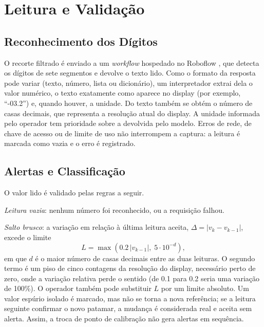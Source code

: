 \documentclass[10pt,twocolumn,letterpaper]{article}
\begin{document}
\section{Leitura e Validação}

\subsection{Reconhecimento dos Dígitos}

O recorte filtrado é enviado a um \textit{workflow} hospedado no Roboflow
\cite{roboflow}, que detecta os dígitos de sete segmentos e devolve o texto
lido. Como o formato da resposta pode variar (texto, número, lista ou
dicionário), um interpretador extrai dela o valor numérico, o texto exatamente
como aparece no display (por exemplo, ``-03.2'') e, quando houver, a unidade.
Do texto também se obtém o número de casas decimais, que representa a
resolução atual do display. A unidade informada pelo operador tem prioridade
sobre a devolvida pelo modelo. Erros de rede, de chave de acesso ou de limite
de uso não interrompem a captura: a leitura é marcada como vazia e o erro é
registrado.

\subsection{Alertas e Classificação}

O valor lido é validado pelas regras a seguir.

\textit{Leitura vazia}: nenhum número foi reconhecido, ou a requisição falhou.

\textit{Salto brusco}: a variação em relação à última leitura aceita,
$\Delta = |v_k - v_{k-1}|$, excede o limite
\begin{equation}
  L = \max\!\left(0.2\,|v_{k-1}|,\; 5 \cdot 10^{-d}\right),
  \label{eq:salto}
\end{equation}
em que $d$ é o maior número de casas decimais entre as duas leituras. O
segundo termo é um piso de cinco contagens da resolução do display, necessário
perto de zero, onde a variação relativa perde o sentido (de 0.1 para 0.2 seria
uma variação de 100\%). O operador também pode substituir $L$ por um limite
absoluto. Um valor espúrio isolado é marcado, mas não se torna a nova
referência; se a leitura seguinte confirmar o novo patamar, a mudança é
considerada real e aceita sem alerta. Assim, a troca de ponto de calibração não
gera alertas em sequência.
\end{document}
